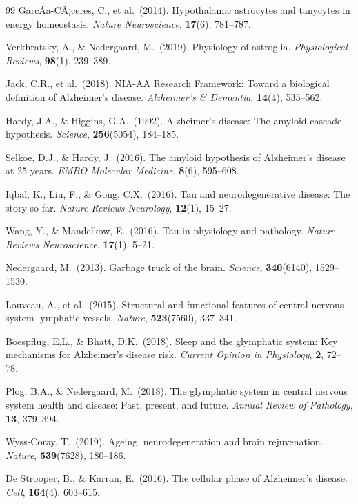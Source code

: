 ﻿\documentclass[12pt,a4paper]{article}
\theoremstyle{definition}
\begin{document}
\begin{thebibliography}{99}
		GarcÃ­a-CÃ¡ceres, C., et al.\ (2014). Hypothalamic astrocytes and tanycytes in energy homeostasis. \textit{Nature Neuroscience}, \textbf{17}(6), 781--787.
		
		Verkhratsky, A., \& Nedergaard, M.\ (2019). Physiology of astroglia. \textit{Physiological Reviews}, \textbf{98}(1), 239--389.
		
		Jack, C.R., et al.\ (2018). NIA-AA Research Framework: Toward a biological definition of Alzheimer's disease. \textit{Alzheimer's \& Dementia}, \textbf{14}(4), 535--562.

		Hardy, J.A., \& Higgins, G.A.\ (1992). Alzheimer's disease: The amyloid cascade hypothesis. \textit{Science}, \textbf{256}(5054), 184--185.

		Selkoe, D.J., \& Hardy, J.\ (2016). The amyloid hypothesis of Alzheimer's disease at 25 years. \textit{EMBO Molecular Medicine}, \textbf{8}(6), 595--608.

		Iqbal, K., Liu, F., \& Gong, C.X.\ (2016). Tau and neurodegenerative disease: The story so far. \textit{Nature Reviews Neurology}, \textbf{12}(1), 15--27.

		Wang, Y., \& Mandelkow, E.\ (2016). Tau in physiology and pathology. \textit{Nature Reviews Neuroscience}, \textbf{17}(1), 5--21.

		Nedergaard, M.\ (2013). Garbage truck of the brain. \textit{Science}, \textbf{340}(6140), 1529--1530.

		Louveau, A., et al.\ (2015). Structural and functional features of central nervous system lymphatic vessels. \textit{Nature}, \textbf{523}(7560), 337--341.

		Boespflug, E.L., \& Bhatt, D.K.\ (2018). Sleep and the glymphatic system: Key mechanisms for Alzheimer's disease risk. \textit{Current Opinion in Physiology}, \textbf{2}, 72--78.

		Plog, B.A., \& Nedergaard, M.\ (2018). The glymphatic system in central nervous system health and disease: Past, present, and future. \textit{Annual Review of Pathology}, \textbf{13}, 379--394.

		Wyss-Coray, T.\ (2019). Ageing, neurodegeneration and brain rejuvenation. \textit{Nature}, \textbf{539}(7628), 180--186.

		De Strooper, B., \& Karran, E.\ (2016). The cellular phase of Alzheimer's disease. \textit{Cell}, \textbf{164}(4), 603--615.


\end{thebibliography}
\end{document}
